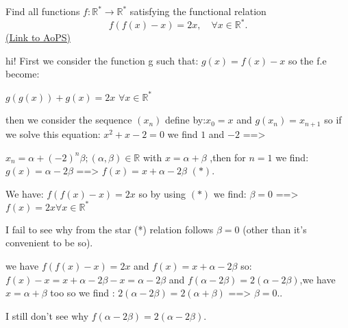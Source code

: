 \begin{problem}
	Find all functions $ f: \mathbb{R^*} \to \mathbb{R^*}$ satisfying the functional relation
\[ f(f(x)-x)=2x, \quad \forall x\in \mathbb{R^*}.\]
	\flushright \href{https://artofproblemsolving.com/community/c6h310761}{(Link to AoPS)}
\end{problem}



\begin{solution}
	hi!
First we consider the function g such that: $ g(x)=f(x)-x$ so the f.e become:

$ g(g(x))+g(x)=2x$ $ \forall x\in{\mathbb{R^{*}}}$

then we consider the sequence $ (x_{n})$ define by:$ x_{0}=x$ and $ g(x_{n})=x_{n+1}$ so if we solve this equation: $ x^{2}+x-2=0$ we find $ 1$ and $ -2$ ==>

 $ x_{n}=\alpha+(-2)^{n}\beta  
 ;(\alpha,\beta)\in{\mathbb{R}}$ with $ x=\alpha+\beta$ ,then for $ n=1$ we find: $ g(x)=\alpha-
2\beta$ ==> $ f(x)=x+\alpha-2\beta$ $ (*)$.

We have: $ f(f(x)-x)=2x$ so by using $ (*)$ we find: $ \beta=0$ ==> $ f(x)=2x \forall x\in{\mathbb{R^{*}}}$
\end{solution}



\begin{solution}
	I fail to see why from the star (*) relation follows $ \beta = 0$ (other than it's convenient to be so).
\end{solution}



\begin{solution}
	we have $ f(f(x)-x)=2x$ and $ f(x)=x+\alpha-2\beta$ so:
$ f(x)-x=x+\alpha-2\beta-x=\alpha-2\beta$ and $ f(\alpha-2\beta)=2(\alpha-2\beta)$,we have $ x=\alpha+\beta$ too so we find : $ 2(\alpha-2\beta)=2(\alpha+\beta)$ ==> $ \beta=0$..
\end{solution}



\begin{solution}
	I still don't see why $ f(\alpha-2\beta)=2(\alpha-2\beta)$.
\end{solution}



